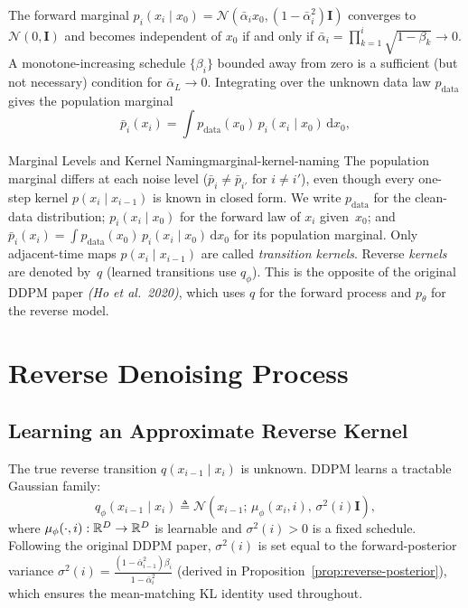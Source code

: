 \documentclass[11pt,a4paper]{article}
\renewcommand{\d}{\mathrm{d}}
\newcommand{\cN}{\mathcal{N}}
\newcommand{\pdata}{p_{\mathrm{data}}}
\newcommand{\bpMarg}[1]{\bar p_{#1}}
\begin{document}
The forward marginal $p_i(x_i\mid x_0)=\cN(\bar\alpha_i x_0,(1-\bar\alpha_i^2)\mathbf{I})$
converges to $\cN(0,\mathbf{I})$ and becomes independent of $x_0$ if and only if
$\bar\alpha_i=\prod_{k=1}^{i}\sqrt{1-\beta_k}\to 0$.
A monotone-increasing schedule $\{\beta_i\}$ bounded away from zero is a sufficient (but not necessary) condition for $\bar\alpha_L\to 0$.
Integrating over the unknown data law $\pdata$ gives the population marginal
\[
\bpMarg{i}(x_i)=\int \pdata(x_0)\,p_i(x_i\mid x_0)\,\d x_0,
\]
\begin{remark}{Marginal Levels and Kernel Naming}{marginal-kernel-naming}
The population marginal differs at each noise level
($\bpMarg{i}\neq \bpMarg{i'}$ for $i\neq i'$), even though every one-step kernel
$p(x_i\mid x_{i-1})$ is known in closed form.
We write $\pdata$ for the clean-data distribution; $p_i(x_i\mid x_0)$ for the
forward law of $x_i$ given~$x_0$; and
$\bpMarg{i}(x_i)=\int \pdata(x_0)\,p_i(x_i\mid x_0)\,\d x_0$ for its population
marginal.
Only adjacent-time maps $p(x_i\mid x_{i-1})$ are called \emph{transition
kernels}. Reverse \emph{kernels} are denoted by~$q$ (learned transitions use
$q_\phi$).
This is the opposite of the original DDPM paper \emph{(Ho et al.\ 2020)}, which
uses $q$ for the forward process and $p_\theta$ for the reverse model.
\end{remark}

\section{Reverse Denoising Process}\label{sec:reverse}

\subsection{Learning an Approximate Reverse Kernel}

The true reverse transition $q(x_{i-1}\mid x_i)$ is unknown.
DDPM learns a tractable Gaussian family:
\[
q_\phi(x_{i-1}\mid x_i)
\triangleq \cN\!\left(x_{i-1};\,\mu_\phi(x_i,i),\,\sigma^2(i)\mathbf{I}\right),
\]
where $\mu_\phi(\cdot,i):\mathbb{R}^D\to\mathbb{R}^D$ is learnable and $\sigma^2(i)>0$ is a fixed
schedule.  Following the original DDPM paper, $\sigma^2(i)$ is set equal to the
forward-posterior variance
$\sigma^2(i)=\frac{(1-\bar\alpha_{i-1}^2)\beta_i}{1-\bar\alpha_i^2}$
(derived in Proposition~\ref{prop:reverse-posterior}), which ensures the
mean-matching KL identity used throughout.
\end{document}
